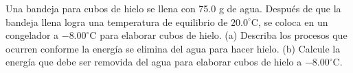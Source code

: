 \item Una bandeja para cubos de hielo se llena con 75.0 g de agua. Después de que la bandeja llena logra una temperatura de equilibrio de $20.0^\circ\text{C}$, se coloca en un congelador a $-8.00^\circ\text{C}$ para elaborar cubos de hielo. (a) Describa los procesos que ocurren conforme la energía se elimina del agua para hacer hielo. (b) Calcule la energía que debe ser removida del agua para elaborar cubos de hielo a $-8.00^\circ\text{C}$.
